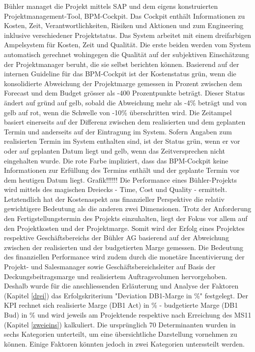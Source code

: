 \documentclass[11pt]{article}
\begin{document}
Bühler managet die Projekt mittels SAP und dem eigens konstruierten Projektmanagement-Tool, BPM-Cockpit. Das Cockpit enthält Informationen zu Kosten, Zeit, Verantwortlichkeiten, Risiken und Aktionen und zum Engineering inklusive verschiedener Projektstatus. Das System arbeitet mit einem dreifarbigen Ampelsystem für Kosten, Zeit und Qualität. Die erste beiden werden vom System automatisch gerechnet wohingegen die Qualität auf der subjektiven Einschätzung der Projektmanager beruht, die sie selbst berichten können. Basierend auf der internen Guideline für das BPM-Cockpit ist der Kostenstatus grün, wenn die konsolidierte Abweichung der Projektmarge gemessen in Prozent zwischen dem Forecast und dem Budget grösser als -400 Prozentpunkte beträgt. Dieser Status ändert auf gründ auf gelb, sobald die Abweichung mehr als -4\% beträgt und von gelb auf rot, wenn die Schwelle von -10\% überschritten wird. Die Zeitampel basiert einerseits auf der Differenz zwischen dem realisierten und dem geplanten Termin und anderseits auf der Eintragung im System. Sofern Angaben zum realisierten Termin im System enthalten sind, ist der Status grün, wenn er vor oder auf geplanten Datum liegt und gelb, wenn das Zeitversprechen nicht eingehalten wurde. Die rote Farbe impliziert, dass das BPM-Cockpit keine Informationen zur Erfüllung des Termins enthält und der geplante Termin vor dem heutigen Datum liegt.
\newline
Grafik!!!!!!
\newline
Die Performance eines Bühler-Projekts wird mittels des magischen Dreiecks - Time, Cost und Quality -  ermittelt. Letztendlich hat der Kostenaspekt aus finanzieller Perspektive die relativ gewichtigere Bedeutung als die anderen zwei Dimensionen. Trotz der Anforderung den Fertigstellungstermin des Projekts einzuhalten, liegt der Fokus vor allem auf den Projektkosten und der Projektmarge. Somit wird der Erfolg eines Projektes respektive Geschäftsbereichs der Bühler AG basierend auf der Abweichung zwischen der realisierten und der budgetierten Marge gemessen. Die Bedeutung des finanziellen Performance wird zudem durch die monetäre Incentivierung der Projekt- und Salesmanager sowie Geschäftsbereichsleiter auf Basis der Deckungsbeitragsmarge und realisiertem Auftragsvolumen hervorgehoben. Deshalb wurde für die anschliessenden Erläuterung und Analyse der Faktoren (Kapitel \ref{drei}) das Erfolgskriterium "Deviation DB1-Marge in \%" festgelegt. Der KPI rechnet sich realisierte Marge (DB1 Act) in \% - budgetierte Marge (DB1 Bud) in \% und wird jeweils am Projektende respektive nach Erreichung des MS11 (Kapitel \ref{zweieins}) kalkuliert. Die ursprünglich 70 Determinanten wurden in sechs Kategorien unterteilt, um eine übersichtliche Darstellung vornehmen zu können. Einige Faktoren könnten jedoch in zwei Kategorien unterssteilt werden. 
\end{document}
